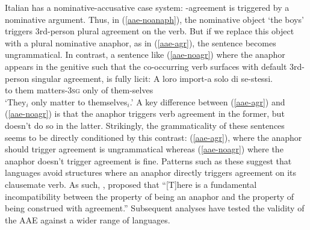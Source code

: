 \documentclass[output=paper, modfonts, nonflat]{langsci/langscibook}
\begin{document}
\z

\noindent Italian has a nominative-accusative case system: \ph-agreement is
triggered by a nominative argument.  Thus, in (\ref{aae-noanaph}), the
nominative object `the boys' triggers 3rd-person plural agreement on
the verb. But if we replace this object with a plural nominative
anaphor, as in (\ref{aae-agr}), the sentence becomes ungrammatical. In
contrast, a sentence like (\ref{aae-noagr}) \citep[][33]{rizzi:1990}
where the anaphor appears in the genitive such that the co-occurring
verb surfaces with default 3rd-person singular agreement, is fully
licit:
   \ea\label{aae-noagr}\gll A loro import-a solo di se-stessi.\\
  to them matters-{\scshape 3sg} only of them-selves\\
  \glt `They$_i$ only matter to themselves$_i$.'
\z
A key difference between (\ref{aae-agr}) and (\ref{aae-noagr}) is that
the anaphor triggers verb agreement in the former, but doesn't do so
in the latter. Strikingly, the grammaticality of these sentences seems
to be directly conditioned by this contrast: (\ref{aae-agr}), where
the anaphor should trigger agreement is ungrammatical whereas
(\ref{aae-noagr}) where the anaphor doesn't trigger agreement is
fine. Patterns such as these suggest that languages avoid structures
where an anaphor directly triggers agreement on its clausemate
verb. As such, \citet[28]{rizzi:1990}, proposed that ``[T]here is a
fundamental incompatibility between the property of being an anaphor
and the property of being construed with agreement.'' Subsequent
analyses \citep{woolford:1999, haegeman:2004, tucker:2011}
have tested the validity of the AAE against a wider range of
languages.
\end{document}
